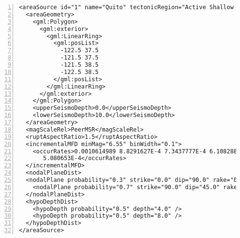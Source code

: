 \begin{Verbatim}[frame=single, commandchars=\\\{\}, fontsize=\footnotesize,
numbers=left, numbersep=2pt]
<areaSource id="1" name="Quito" tectonicRegion="Active Shallow Crust">
  <areaGeometry>
    <gml:Polygon>
      <gml:exterior>
        <gml:LinearRing>
          <gml:posList>
            -122.5 37.5
            -121.5 37.5
            -121.5 38.5
            -122.5 38.5
          </gml:posList>
        </gml:LinearRing>
      </gml:exterior>
    </gml:Polygon>
    <upperSeismoDepth>0.0</upperSeismoDepth>
    <lowerSeismoDepth>10.0</lowerSeismoDepth>
  </areaGeometry>
  <magScaleRel>PeerMSR</magScaleRel>
  <ruptAspectRatio>1.5</ruptAspectRatio>
  <incrementalMFD minMag="6.55" binWidth="0.1">
    <occurRates>0.0010614989 8.8291627E-4 7.3437777E-4 6.108288E-4
       5.080653E-4</occurRates>
  </incrementalMFD>
  <nodalPlaneDist>
  <nodalPlane probability="0.3" strike="0.0" dip="90.0" rake="0.0"/>
    <nodalPlane probability="0.7" strike="90.0" dip="45.0" rake="90.0"/>
  </nodalPlaneDist>
  <hypoDepthDist>
    <hypoDepth probability="0.5" depth="4.0" />
    <hypoDepth probability="0.5" depth="8.0" />
  </hypoDepthDist>
</areaSource>
\end{Verbatim}